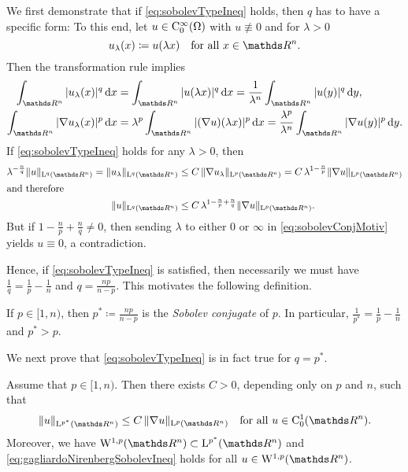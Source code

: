\begin{motiv}
  We first demonstrate that if \eqref{eq:sobolevTypeIneq} holds, then $q$ has to have a specific form:
  To this end, let $u \in \mathrm{C}_0^\infty(\Omega)$ with $u \not\equiv 0$ and for $\lambda > 0$
  $$
  u_\lambda(x) \coloneqq u(\lambda x) \quad\text{for all } x \in \R^n.
  $$
  Then the transformation rule implies
  \begin{align*}
    \int_{\R^n} |u_\lambda(x)|^q \d x 
    &= \int_{\R^n} |u(\lambda x)|^q \d x
    = \frac{1}{\lambda^n} \int_{\R^n} |u(y)|^q \d y, \\
    \int_{\R^n} |\nabla u_\lambda(x) |^p \d x &= \lambda^p \int_{\R^n} |(\nabla u)(\lambda x)|^p \d x = \frac{\lambda^p}{\lambda^n} \int_{\R^n} |\nabla u(y)|^p \d y.
  \end{align*}
  If \eqref{eq:sobolevTypeIneq} holds for any $\lambda > 0$, then 
  \begin{align}
  \lambda^{-\frac{n}{q}} \| u\|_{\Ell^q(\R^n)}
  = \| u_\lambda\|_{\Ell^q(\R^n)}
    &\leq C \, \|\nabla u_\lambda\|_{\Ell^p(\R^n)}
  = C \, \lambda^{1 - \frac{n}{p}} \| \nabla u \|_{\Ell^p(\R^n)} \nonumber\\
  \intertext{and therefore}
    \label{eq:sobolevConjMotiv}
    \|u \|_{\Ell^q(\R^n)} 
    &\leq C \, \lambda^{1 - \frac{n}{p} + \frac{n}{q}} \|\nabla u\|_{\Ell^p(\R^n)}.
\end{align}
  But if $1 - \frac{n}{p} + \frac{n}{q} \neq 0$, then sending $\lambda$ to either $0$ or $\infty$ in \eqref{eq:sobolevConjMotiv} yields $u \equiv 0$, a contradiction.

  Hence, if \eqref{eq:sobolevTypeIneq} is satisfied, then necessarily we must have $\frac{1}{q} = \frac{1}{p} - \frac{1}{n}$ and $q = \frac{n p }{n - p}$.
  This motivates the following definition.
\end{motiv}

\begin{defn}
  If $p \in [1,n)$, then $p^* \coloneqq \frac{np}{n - p}$ is the \emph{Sobolev conjugate} of $p$.
  In particular, $\frac{1}{p^*} = \frac{1}{p} - \frac{1}{n}$ and $p^* > p$.
\end{defn}

We next prove that \eqref{eq:sobolevTypeIneq} is in fact true for $q = p^*$.

\begin{thm}
  \label{thm:gagliardoNirenberg}
  Assume that $p \in [1,n)$.
  Then there exists $C > 0$, depending only on $p$ and $n$, such that
  \begin{equation}
    \label{eq:gagliardoNirenbergSobolevIneq}
    \| u\|_{\Ell^{p^*}(\R^n)} \leq C \, \|\nabla u\|_{\Ell^p(\R^n)} \quad\text{for all } u \in \CC_0^1(\R^n).
  \end{equation}
  Moreover, we have $\WW^{1,p}(\R^n) \subset \Ell^{p^*}(\R^n)$ and \eqref{eq:gagliardoNirenbergSobolevIneq} holds for all $u \in \WW^{1,p}(\R^n)$.
\end{thm}

